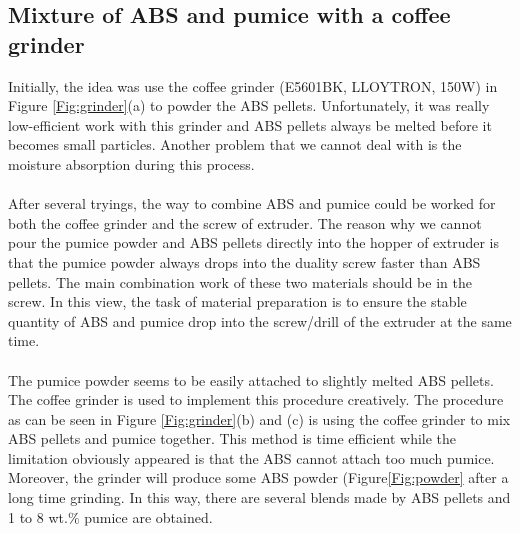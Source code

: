 \subsection{Mixture of ABS and pumice with a coffee grinder}
Initially, the idea was use the coffee grinder (E5601BK, LLOYTRON, 150W) in Figure \ref{Fig:grinder}(a) to powder the ABS pellets. Unfortunately, it was really low-efficient work with this grinder and ABS pellets always be melted before it becomes small particles. Another problem that we cannot deal with is the moisture absorption during this process.\\
\\
After several tryings, the way to combine ABS and pumice could be worked for both the coffee grinder and the screw of extruder. The reason why we cannot pour the pumice powder and ABS pellets directly into the hopper of extruder is that the pumice powder always drops into the duality screw faster than ABS pellets. The main combination work of these two materials should be in the screw. In this view, the task of material preparation is to ensure the stable quantity of ABS and pumice drop into the screw/drill of the extruder at the same time. \\
\\
The pumice powder seems to be easily attached to slightly melted ABS pellets. The coffee grinder is used to implement this procedure creatively. The procedure as can be seen in Figure \ref{Fig:grinder}(b) and (c) is using the coffee grinder to mix ABS pellets and pumice together. This method is time efficient while the limitation obviously appeared is that the ABS cannot attach too much pumice. Moreover, the grinder will produce some ABS powder (Figure\ref{Fig:powder} after a long time grinding. In this way, there are several blends made by ABS pellets and 1 to 8 wt.$\%$ pumice are obtained. \\

